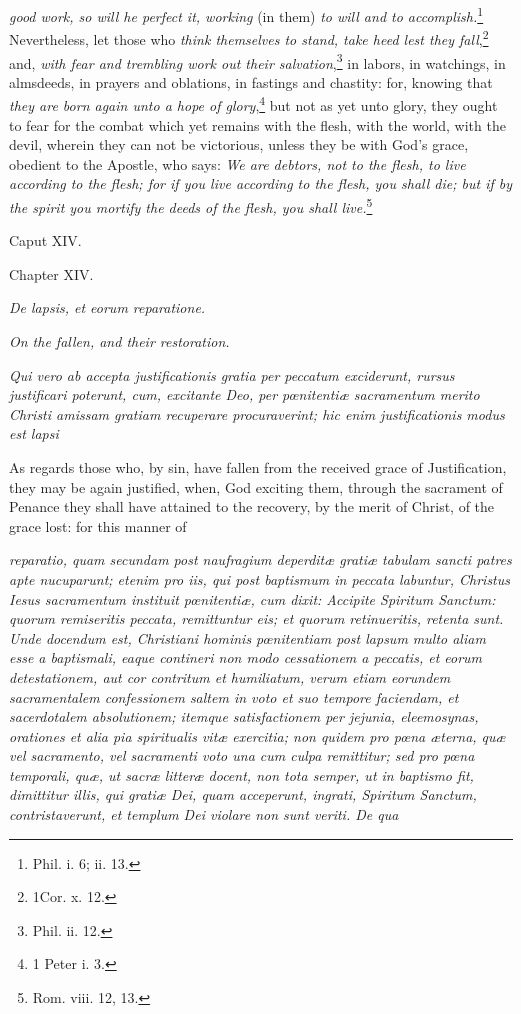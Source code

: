 \emph{good work, so will he perfect it, working} (in them) \emph{to will and to accomplish.}\footnote{\par  \par   Phil. i. 6; ii. 13.} Nevertheless, let those who \emph{think themselves to stand, take heed lest they fall},\footnote{\par   1Cor. x. 12.} and, \emph{with fear and trembling work out their salvation},\footnote{\par   Phil. ii. 12.} in labors, in watchings, in almsdeeds, in prayers and oblations, in fastings and chastity: for, knowing that \emph{they are born again unto a hope of glory},\footnote{\par   1 Peter i. 3.} but not as yet unto glory, they ought to fear for the combat which yet remains with the flesh, with the world, with the devil, wherein they can not be victorious, unless they be with God's grace, obedient to the Apostle, who says: \emph{We are debtors, not to the flesh, to live according to the flesh; for if you live according to the flesh, you shall die; but if by the spirit you mortify the deeds of the flesh, you shall live.}\footnote{\par   Rom. viii. 12, 13.}

Caput XIV.

Chapter XIV.

\emph{De lapsis, et eorum reparatione.}

\emph{On the fallen, and their restoration.}

\emph{Qui vero ab accepta justificationis gratia per peccatum exciderunt, rursus justificari poterunt, cum, excitante Deo, per pœnitentiæ sacramentum merito Christi amissam gratiam recuperare procuraverint; hic enim justificationis modus est lapsi }

As regards those who, by sin, have fallen from the received grace of Justification, they may be again justified, when, God exciting them, through the sacrament of Penance they shall have attained to the recovery, by the merit of Christ, of the grace lost: for this manner of

\emph{reparatio, quam secundam post naufragium deperditæ gratiæ tabulam sancti patres apte nucuparunt; etenim pro iis, qui post baptismum in peccata labuntur, Christus Iesus sacramentum instituit pœnitentiæ, cum dixit: Accipite Spiritum Sanctum: quorum remiseritis peccata, remittuntur eis; et quorum retinueritis, retenta sunt. Unde docendum est, Christiani hominis pœnitentiam post lapsum multo aliam esse a baptismali, eaque contineri non modo cessationem a peccatis, et eorum detestationem, aut cor contritum et humiliatum, verum etiam eorundem sacramentalem confessionem saltem in voto et suo tempore faciendam, et sacerdotalem absolutionem; itemque satisfactionem per jejunia, eleemosynas, orationes et alia pia spiritualis vitæ exercitia; non quidem pro pœna æterna, quæ vel sacramento, vel sacramenti voto una cum culpa remittitur; sed pro pœna temporali, quæ, ut sacræ litteræ docent, non tota semper, ut in baptismo fit, dimittitur illis, qui gratiæ Dei, quam acceperunt, ingrati, Spiritum Sanctum, contristaverunt, et templum Dei violare non sunt veriti. De qua }


